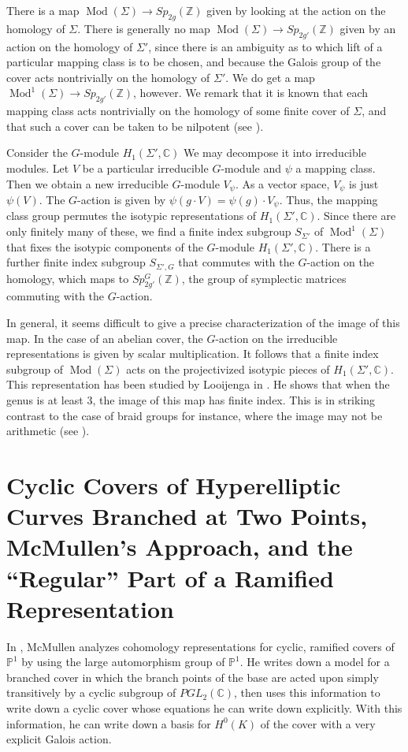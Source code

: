 \documentclass[11pt]{amsart}
\numberwithin{thm}{section}
\begin{document}
There is a map ${\operatorname{Mod}}(\Sigma)\to Sp_{2g}({\mathbb{Z}})$ given by looking at the action on the homology of $\Sigma$.  There is generally no map ${\operatorname{Mod}}(\Sigma)\to Sp_{2g'}({\mathbb{Z}})$ given by an action on the homology of $\Sigma'$, since there is an ambiguity as to which lift of a particular mapping class is to be chosen, and because the Galois group of the cover acts nontrivially on the homology of $\Sigma'$.  We do get a map ${\operatorname{Mod}}^1(\Sigma)\to Sp_{2g'}({\mathbb{Z}})$, however.  We remark that it is known that each mapping class acts nontrivially on the homology of some finite cover of $\Sigma$, and that such a cover can be taken to be nilpotent (see \cite{K}).

Consider the $G$-module $H_1(\Sigma',{\mathbb{C}})$  We may decompose it into irreducible modules.  Let $V$ be a particular irreducible $G$-module and $\psi$ a mapping class.  Then we obtain a new irreducible $G$-module $V_{\psi}$.  As a vector space, $V_{\psi}$ is just $\psi(V)$.  The $G$-action is given by $\psi(g\cdot V)=\psi(g)\cdot V_{\psi}$.  Thus, the mapping class group permutes the isotypic representations of $H_1(\Sigma',{\mathbb{C}})$.  Since there are only finitely many of these, we find a finite index subgroup $S_{\Sigma'}$ of ${\operatorname{Mod}}^1(\Sigma)$ that fixes the isotypic components of the $G$-module $H_1(\Sigma',{\mathbb{C}})$.  There is a further finite index subgroup $S_{\Sigma',G}$ that commutes with the $G$-action on the homology, which maps to $Sp_{2g'}^G({\mathbb{Z}})$, the group of symplectic matrices commuting with the $G$-action.

In general, it seems difficult to give a precise characterization of the image of this map.  In the case of an abelian cover, the $G$-action on the irreducible representations is given by scalar multiplication.  It follows that a finite index subgroup of ${\operatorname{Mod}}(\Sigma)$ acts on the projectivized isotypic pieces of $H_1(\Sigma',{\mathbb{C}})$.  This representation has been studied by Looijenga in \cite{L}.  He shows that when the genus is at least $3$, the image of this map has finite index.  This is in striking contrast to the case of braid groups for instance, where the image may not be arithmetic (see \cite{Mc}).
\section{Cyclic Covers of Hyperelliptic Curves Branched at Two Points, McMullen's Approach, and the ``Regular'' Part of a Ramified Representation}\label{s:cyclic}
In \cite{Mc}, McMullen analyzes cohomology representations for cyclic, ramified covers of $\mathbb{P}^1$ by using the large automorphism group of $\mathbb{P}^1$.  He writes down a model for a branched cover in which the branch points of the base are acted upon simply transitively by a cyclic subgroup of $PGL_2(\mathbb{C})$, then uses this information to write down a cyclic cover whose equations he can write down explicitly.  With this information, he can write down a basis for $H^0(K)$ of the cover with a very explicit Galois action.
\end{document}
